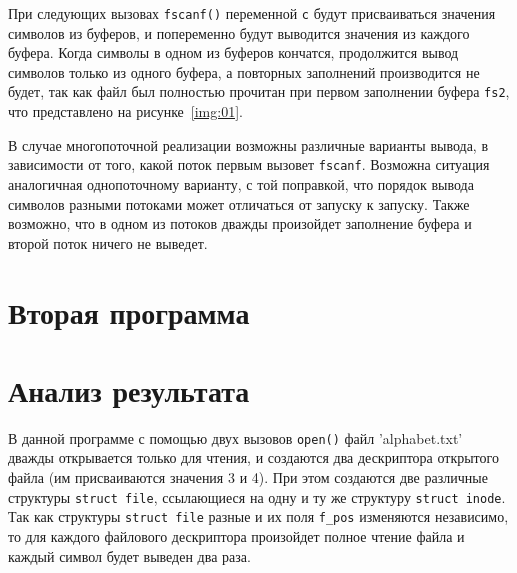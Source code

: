 При следующих вызовах \texttt{fscanf()} переменной \texttt{c} будут
присваиваться значения символов из буферов, и попеременно будут выводится
значения из каждого буфера. Когда символы в одном из буферов кончатся,
продолжится вывод символов только из одного буфера, а повторных заполнений
производится не будет, так как файл был полностью прочитан при первом заполнении
буфера \texttt{fs2}, что представлено на рисунке~\ref{img:01}.

В случае многопоточной реализации возможны различные варианты вывода, в
зависимости от того, какой поток первым вызовет \texttt{fscanf}. Возможна
ситуация аналогичная однопоточному варианту, с той поправкой, что порядок вывода
символов разными потоками может отличаться от запуску к запуску. Также возможно,
что в одном из потоков дважды произойдет заполнение буфера и второй поток ничего
не выведет.


\newpage
\section{Вторая программа}

\vspace{-0.5cm}


\clearpage
{}


\vspace{-0.7cm}
\section*{Анализ результата}
\vspace{-0.2cm}

В данной программе с помощью двух вызовов \texttt{open()} файл 'alphabet.txt'
дважды открывается только для чтения, и создаются два дескриптора открытого
файла (им присваиваются значения 3 и 4). При этом создаются две различные
структуры \texttt{struct file}, ссылающиеся на одну и ту же структуру
\texttt{struct~inode}. Так как структуры \texttt{struct file} разные и их поля
\texttt{f\_pos} изменяются независимо, то для каждого файлового дескриптора
произойдет полное чтение файла и каждый символ будет выведен два
раза.

